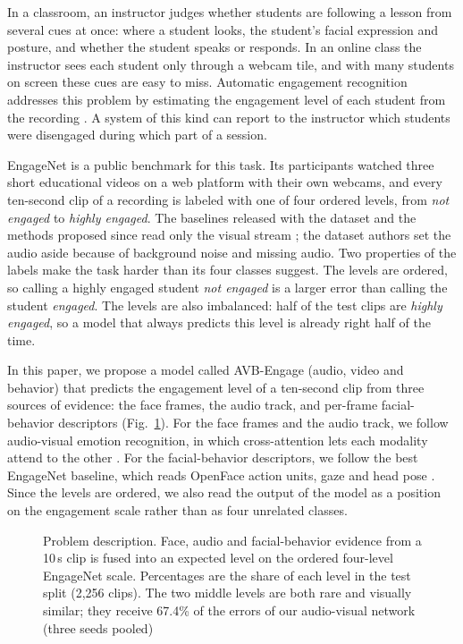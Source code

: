 \documentclass[pdflatex,iicol,sn-basic]{sn-jnl}
\newcommand{\ournet}{AVB-Engage}
\begin{document}
In a classroom, an instructor judges whether students are following a lesson from several cues at once: where a student looks, the student's facial expression and posture, and whether the student speaks or responds. In an online class the instructor sees each student only through a webcam tile, and with many students on screen these cues are easy to miss. Automatic engagement recognition addresses this problem by estimating the engagement level of each student from the recording \citep{qarbal2025review,mandia2023review}. A system of this kind can report to the instructor which students were disengaged during which part of a session.

EngageNet \citep{singh2023engagenet} is a public benchmark for this task. Its participants watched three short educational videos on a web platform with their own webcams, and every ten-second clip of a recording is labeled with one of four ordered levels, from \emph{not engaged} to \emph{highly engaged}. The baselines released with the dataset and the methods proposed since read only the visual stream \citep{singh2023engagenet,vedernikov2024tcct,abedi2024stgcn,vedernikov2026priornet,augusma2026vemd}; the dataset authors set the audio aside because of background noise and missing audio. Two properties of the labels make the task harder than its four classes suggest. The levels are ordered, so calling a highly engaged student \emph{not engaged} is a larger error than calling the student \emph{engaged}. The levels are also imbalanced: half of the test clips are \emph{highly engaged}, so a model that always predicts this level is already right half of the time.

In this paper, we propose a model called \ournet{} (audio, video and behavior) that predicts the engagement level of a ten-second clip from three sources of evidence: the face frames, the audio track, and per-frame facial-behavior descriptors (Fig.~\ref{fig:concept}). For the face frames and the audio track, we follow audio-visual emotion recognition, in which cross-attention lets each modality attend to the other \citep{venkatraman2025avtca}. For the facial-behavior descriptors, we follow the best EngageNet baseline, which reads OpenFace action units, gaze and head pose \citep{singh2023engagenet}. Since the levels are ordered, we also read the output of the model as a position on the engagement scale rather than as four unrelated classes.

\begin{figure}[t]
\centering
\resizebox{0.78\textwidth}{!}{}
\caption{Problem description. Face, audio and facial-behavior evidence from a 10\,s clip is fused into an expected level on the ordered four-level EngageNet scale. Percentages are the share of each level in the test split (2,256 clips). The two middle levels are both rare and visually similar; they receive 67.4\% of the errors of our audio-visual network (three seeds pooled)}
\label{fig:concept}
\end{figure}
\end{document}
